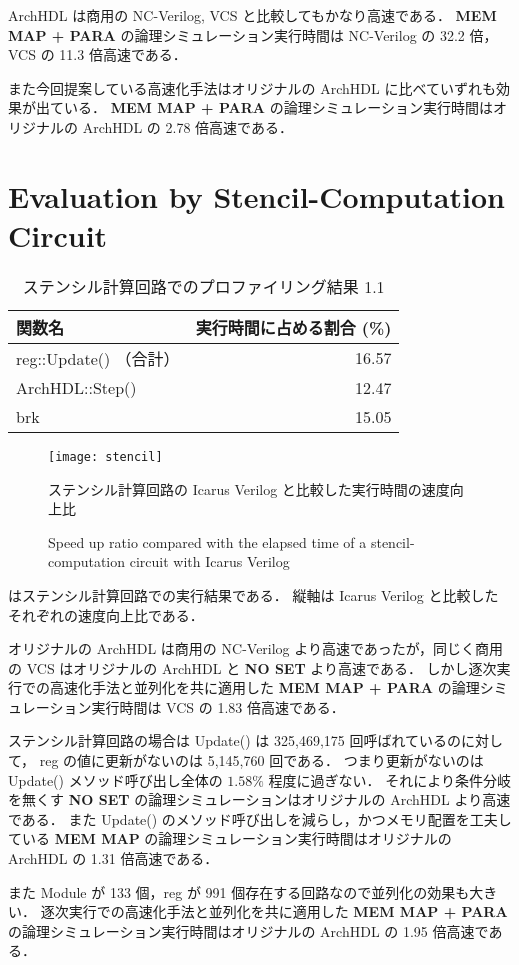 ArchHDL は商用の NC-Verilog, VCS と比較してもかなり高速である．
\textbf{MEM MAP + PARA} の論理シミュレーション実行時間は NC-Verilog の 32.2 倍，VCS の 11.3 倍高速である．

また今回提案している高速化手法はオリジナルの ArchHDL に比べていずれも効果が出ている．
\textbf{MEM MAP + PARA} の論理シミュレーション実行時間はオリジナルの ArchHDL の 2.78 倍高速である．


\section{Evaluation by Stencil-Computation Circuit}


\begin{table}[tb]
 \caption{ステンシル計算回路でのプロファイリング結果 1.1}
 \label{table:stencil_prof1.1}
 \begin{center}
  \begin{tabular}{lr} \toprule
  関数名 & 実行時間に占める割合 (\%) \\ \midrule
  reg::Update() （合計） & 16.57 \\
  ArchHDL::Step() & 12.47 \\
  brk & 15.05 \\ \bottomrule
  \end{tabular}
 \end{center}
\end{table}

\fi

\begin{figure}[tb]
 \centering
 \texttt{[image: stencil]}
 \caption{ステンシル計算回路の Icarus Verilog と比較した実行時間の速度向上比}
\fi
 \caption{Speed up ratio compared with the elapsed time of a stencil-computation circuit with Icarus Verilog}
 \label{fig:stencil}
\end{figure}

 はステンシル計算回路での実行結果である．
縦軸は Icarus Verilog と比較したそれぞれの速度向上比である．

オリジナルの ArchHDL は商用の NC-Verilog より高速であったが，同じく商用の VCS はオリジナルの ArchHDL と \textbf{NO SET} より高速である．
しかし逐次実行での高速化手法と並列化を共に適用した \textbf{MEM MAP + PARA} の論理シミュレーション実行時間は VCS の 1.83 倍高速である．

ステンシル計算回路の場合は Update() は 325,469,175 回呼ばれているのに対して，
reg の値に更新がないのは 5,145,760 回である．
つまり更新がないのは Update() メソッド呼び出し全体の $1.58\%$ 程度に過ぎない．
それにより条件分岐を無くす \textbf{NO SET} の論理シミュレーションはオリジナルの ArchHDL より高速である．
また Update() のメソッド呼び出しを減らし，かつメモリ配置を工夫している \textbf{MEM MAP} の論理シミュレーション実行時間はオリジナルの ArchHDL の 1.31 倍高速である．

また Module が 133 個，reg が 991 個存在する回路なので並列化の効果も大きい．
逐次実行での高速化手法と並列化を共に適用した \textbf{MEM MAP + PARA} の論理シミュレーション実行時間はオリジナルの ArchHDL の 1.95 倍高速である．


